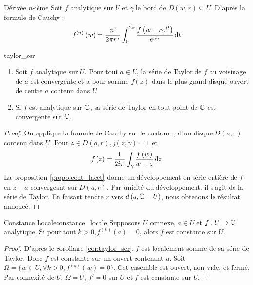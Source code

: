 \documentclass{cours}
\begin{document}
\begin{propositionfr}{Dérivée $n$-ième}{}
    Soit $f$ analytique sur $U$ et $\gamma$ le bord de $\overline{D}\left(w, r\right) \subseteq U$. D'après la formule de Cauchy : 
    \begin{equation*}
        f^{\left(n\right)}\left(w\right) = \frac{n!}{2\pi r^{n}}\int_{0}^{2\pi}\frac{f\left(w + re^{it}\right)}{e^{nit}}{\rm \, d} t
    \end{equation*}
\end{propositionfr}

\begin{corollaire}{}{taylor_ser}
    \begin{enumerate}
        \item Soit $f$ analytique sur $U$. Pour tout $a \in U$, la série de Taylor de $f$ au voisinage de $a$ est convergente et a pour somme $f\left(z\right)$ dans le plus grand disque ouvert de centre $a$ contenu dans $U$
        \item Si $f$ est analytique sur $\mathbb{C}$, sa série de Taylor en tout point de $\mathbb{C}$ est convergente sur $\mathbb{C}$. 
    \end{enumerate}
\end{corollaire}
\begin{proof}
    On applique la formule de Cauchy sur le contour $\gamma$ d'un disque $D\left(a, r\right)$ contenu dans $U$. Pour $z \in D\left(a, r\right), j\left(z, \gamma\right) = 1$ et 
    \begin{equation*}
        f\left(z\right) = \frac{1}{2i\pi}\int_{\gamma}^{}\frac{f\left(w\right)}{w -z}{\rm \, d} z
    \end{equation*}
    La proposition \ref{propo:cont_lacet} donne un développement en série entière de $f$ en $z - a$ convergeant sur $D\left(a, r\right)$. Par unicité du développement, il s'agit de la série de Taylor. En faisant tendre $r$ vers $d\left(a, \mathbb{C} - U\right)$, nous obtenons le résultat annoncé. 
\end{proof}

\begin{corollaire}{Constance Locale}{constance_locale}
    Supposons $U$ connexe, $a \in U$ et $f : U \to \mathbb{C}$ analytique. Si pour tout $k > 0, f^{\left(k\right)}\left(a\right) = 0$, alors $f$ est constante sur $U$. 
\end{corollaire}
\begin{proof}
    D'après le corollaire \ref{cor:taylor_ser}, $f$ est localement somme de sa série de Taylor. Donc $f$ est constante sur un ouvert contenant $a$. Soit $\Omega = \{w \in U, \forall k > 0, f^{\left(k\right)}\left(w\right) = 0\}$. Cet ensemble est ouvert, non vide, et fermé. Par connexité de $U$, $\Omega = U$, $f' = 0$ sur $U$ et $f$ est constante sur $U$.
\end{proof}
\end{document}
